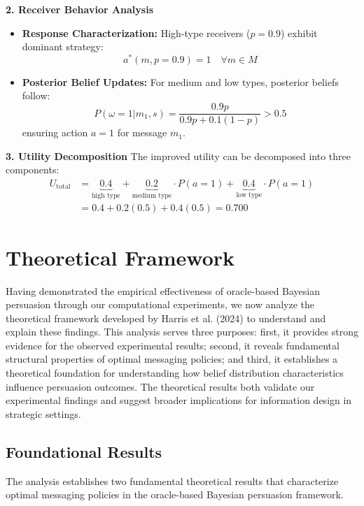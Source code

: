 \documentclass[12pt]{article}
\theoremstyle{plain}
\theoremstyle{definition}
\theoremstyle{remark}
\begin{document}
\textbf{2. Receiver Behavior Analysis}
\begin{itemize}
    \item \textbf{Response Characterization:} High-type receivers ($p=0.9$) exhibit dominant strategy:
    \begin{equation}
        a^*(m,p=0.9) = 1 \quad \forall m \in M
    \end{equation}
    
    \item \textbf{Posterior Belief Updates:} For medium and low types, posterior beliefs follow:
    \begin{equation}
        P(\omega=1|m_1,s) = \frac{0.9p}{0.9p + 0.1(1-p)} > 0.5
    \end{equation}
    ensuring action $a=1$ for message $m_1$.
\end{itemize}

\textbf{3. Utility Decomposition}
The improved utility can be decomposed into three components:
\begin{align*}
    U_{\text{total}} &= \underbrace{0.4}_{\text{high type}} + \underbrace{0.2}_{\text{medium type}} \cdot P(a=1) + \underbrace{0.4}_{\text{low type}} \cdot P(a=1) \\
    &= 0.4 + 0.2(0.5) + 0.4(0.5) = 0.700
\end{align*}

\section{Theoretical Framework}

Having demonstrated the empirical effectiveness of oracle-based Bayesian persuasion through our computational experiments, we now analyze the theoretical framework developed by Harris et al. (2024) to understand and explain these findings. This analysis serves three purposes: first, it provides strong evidence for the observed experimental results; second, it reveals fundamental structural properties of optimal messaging policies; and third, it establishes a theoretical foundation for understanding how belief distribution characteristics influence persuasion outcomes. The theoretical results both validate our experimental findings and suggest broader implications for information design in strategic settings.

\subsection{Foundational Results}
The analysis establishes two fundamental theoretical results that characterize optimal messaging policies in the oracle-based Bayesian persuasion framework.
\end{document}
